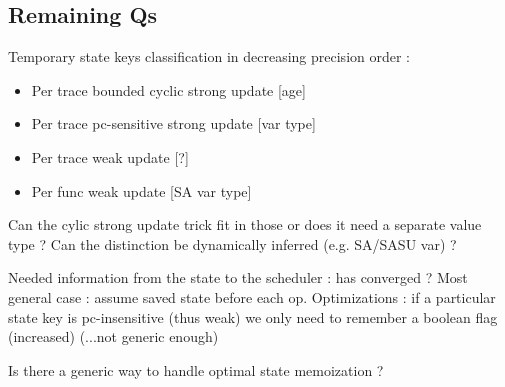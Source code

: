 \documentclass[14pt]{article}
\begin{document}
\subsection{Remaining Qs}

Temporary state keys classification in decreasing precision order :
\begin{itemize}
\item Per trace bounded cyclic strong update [age]
\item Per trace pc-sensitive strong update [var type]
\item Per trace weak update [?]
\item Per func weak update [SA var type]
\end{itemize}
Can the cylic strong update trick fit in those or does it need a separate value type ? Can the distinction be dynamically inferred (e.g. SA/SASU var) ?

Needed information from the state to the scheduler : has converged ?
Most general case : assume saved state before each op.
Optimizations :
if a particular state key is pc-insensitive (thus weak) we only need to remember a boolean flag (increased) (...not generic enough)

Is there a generic way to handle optimal state memoization ?
\end{document}

